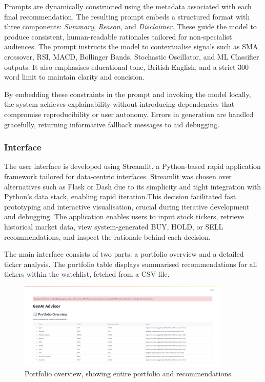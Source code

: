 Prompts are dynamically constructed using the metadata associated with each final recommendation. The resulting prompt embeds a structured format with three components: \textit{Summary}, \textit{Reason}, and \textit{Disclaimer}. These guide the model to produce consistent, human-readable rationales tailored for non-specialist audiences. The prompt instructs the model to contextualise signals such as SMA crossover, RSI, MACD, Bollinger Bands, Stochastic Oscillator, and ML Classifier outputs. It also emphasises educational tone, British English, and a strict 300-word limit to maintain clarity and concision.

By embedding these constraints in the prompt and invoking the model locally, the system achieves explainability without introducing dependencies that compromise reproducibility or user autonomy. Errors in generation are handled gracefully, returning informative fallback messages to aid debugging.

\subsubsection{Interface}

The user interface is developed using Streamlit, a Python-based rapid application framework tailored for data-centric interfaces. Streamlit was chosen over alternatives such as Flask or Dash due to its simplicity and tight integration with Python’s data stack, enabling rapid iteration.This decision facilitated fast prototyping and interactive visualisation, crucial during iterative development and debugging. The application enables users to input stock tickers, retrieve historical market data, view system-generated BUY, HOLD, or SELL recommendations, and inspect the rationale behind each decision.

The main interface consists of two parts: a portfolio overview and a detailed ticker analysis. The portfolio table displays summarised recommendations for all tickers within the watchlist, fetched from a CSV file. 

\begin{figure}[ht]
    \centering
    \includegraphics[width=0.9\textwidth]{assets/ui1-portfolio_overview.png}
    \caption{\small Portfolio overview, showing entire portfolio and recommendations.}
    \label{fig:ui-portfolio-overview}
\end{figure}

